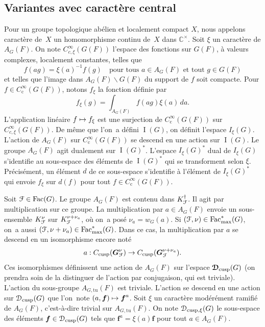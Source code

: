 \documentclass[11pt]{article}
\numberwithin{equation}{section}\providecommand{\og}{«\,}\providecommand{\fg}{\,»}
\let\mathcal \EuScript
\newcommand\mto{\mathchoice{\longmapsto}{\mapsto}{\mapsto}{\mapsto}}
\newcommand{\rc}{\mathrm{c}}
\newcommand{\cusp}{\mathrm{cusp}}
\newcommand{\Fac}{\mathrm{Fac}}
\newcommand{\tu}{\mathrm{tu}}
\DeclareMathOperator{\rI}{I}
\newcommand{\bmf}{\boldsymbol{f}}
\newcommand{\bG}{\boldsymbol{G}}
\newcommand{\cD}{\mathcal{D}}
\newcommand{\cF}{\mathcal{F}}
\newcommand{\CC}{\mathbb{C}}
\theoremstyle{plain}
\theoremstyle{definition}
\begin{document}
\subsection{Variantes avec caractère central}\label{varianteaveccaracterecentral}
Pour un groupe topologique abélien et localement compact $X$, nous appelons caractère de~$X$ un homomorphisme continu de~$X$ dans $\CC^{\times}$.
Soit $\xi$ un caractère de $A_{G}(F)$. On note $C_{c,\xi}^{\infty}(G(F))$ l'espace des fonctions sur $G(F)$, à valeurs complexes, localement constantes, telles que
\[
f(ag)=\xi(a)^{-1}f(g)\quad \text{pour tous $a\in A_{G}(F)$ et tout $g\in G(F)$}
\]
et telles que l'image dans $A_{G}(F)\backslash G(F)$ du support de $f$ soit compacte. Pour $f\in C_{\rc}^{\infty}(G(F))$, notons $f_{\xi}$ la fonction définie par
\[
f_{\xi}(g)=\int_{A_{G}(F)}f(ag)\xi(a)\,da.
\]
L'application linéaire $f\mto f_{\xi}$ est une surjection de $C_{\rc}^{\infty}(G(F))$ sur $ C_{c,\xi}^{\infty}(G(F))$. De même que l'on~a défini $\rI(G)$, on définit l'espace $I_{\xi}(G)$. L'action de $A_{G}(F)$ sur $C_{\rc}^{\infty}(G(F))$ se descend en une action sur $\rI(G)$. Le groupe $A_{G}(F)$ agit dualement sur $\rI(G)^*$. L'espace $I_{\xi}(G)^*$ dual de $I_{\xi}(G)$ s'identifie au sous-espace des éléments de $\rI(G)^*$ qui se transforment selon $\xi$. Précisément, un élément $d$ de ce sous-espace s'identifie à l'élément de $I_{\xi}(G)^*$ qui envoie $f_{\xi}$ sur $d(f)$ pour tout $f\in C_{\rc}^{\infty}(G(F))$.

Soit $\cF\in \Fac(G)$. Le groupe $A_{G}(F)$ est contenu dans $K_{\cF}^{\dag}$. Il agit par multiplication sur ce groupe. La multiplication par $a\in A_{G}(F)$ envoie un sous-ensemble $K_{\cF}^{\nu}$ sur $K_{\cF}^{\nu+\nu_{a}}$, où on~a posé $\nu_{a}=w_{G}(a)$. Si $(\cF,\nu)\in \Fac^*_{\max}(G)$, on~a aussi $(\cF,\nu+\nu_{a})\in \Fac^*_{\max}(G)$. Dans ce cas, la multiplication par $a$ se descend en un isomorphisme encore noté
\[
a:C_{\cusp}(\bG_{\cF}^{\nu})\to C_{\cusp}(\bG_{\cF}^{\nu+\nu_{a}}).
\]
Ces isomorphismes définissent une action de $A_{G}(F)$ sur l'espace $\boldsymbol{\cD}_{\cusp}(G)$ (on prendra soin de la distinguer de l'action par conjugaison, qui est triviale). L'action du sous-groupe $A_{G,\tu}(F)$ est triviale. L'action se descend en une action sur $\cD_{\cusp}(G)$ que l'on~note $(a,\bmf)\mto \bmf^{a}$. Soit $\xi$ un caractère modérément ramifié de $A_{G}(F)$, c'est-à-dire trivial sur $A_{G,\tu}(F)$. On note $\cD_{\cusp,\xi}(G)$ le sous-espace des éléments $\bmf\in \cD_{\cusp}(G)$ tels que $\bmf^{a}=\xi(a)\bmf$ pour tout $a\in A_{G}(F)$.
\end{document}
